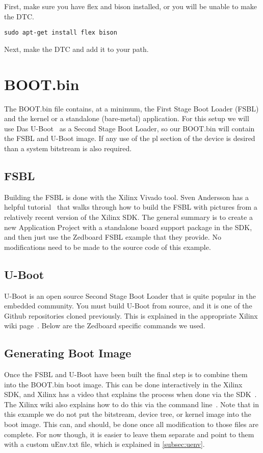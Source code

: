 \documentclass[thesis.tex]{subfile}
\begin{document}
First, make sure you have flex and bison installed, or you will be unable to make the DTC.
\begin{lstlisting}
sudo apt-get install flex bison
\end{lstlisting}

Next, make the DTC and add it to your path.


\section{BOOT.bin}
The BOOT.bin file contains, at a minimum, the First Stage Boot Loader (FSBL) and the kernel or a standalone (bare-metal) application.
For this setup we will use Das U-Boot~\cite{UBoot} as a Second Stage Boot Loader, so our BOOT.bin will contain the FSBL and U-Boot image.
If any use of the \gls{pl} section of the device is desired than a system bitstream is also required.

\subsection{FSBL}
Building the FSBL is done with the Xilinx Vivado tool.
Sven Andersson has a helpful tutorial~\cite{BuildFSBL} that walks through how to build the FSBL with pictures from a relatively recent version of the Xilinx SDK. The general summary is to create a new Application Project with a standalone board support package in the SDK, and then just use the Zedboard FSBL example that they provide. No modifications need to be made to the source code of this example.

\subsection{U-Boot}
U-Boot is an open source Second Stage Boot Loader that is quite popular in the embedded community. You must build U-Boot from source, and it is one of the Github repositories cloned previously. This is explained in the appropriate Xilinx wiki page~\cite{BuildUBoot}. Below are the Zedboard specific commands we used.



\subsection{Generating Boot Image}
Once the FSBL and U-Boot have been built the final step is to combine them into the BOOT.bin boot image. This can be done interactively in the Xilinx SDK, and Xilinx has a video that explains the process when done via the SDK~\cite{BootImageVideo}. The Xilinx wiki also explains how to do this via the command line~\cite{PrepareBootImage}.
Note that in this example we do not put the bitstream, device tree, or kernel image into the boot image. This can, and should, be done once all modification to those files are complete. For now though, it is easier to leave them separate and point to them with a custom uEnv.txt file, which is explained in \cref{subsec:uenv}.
\end{document}
